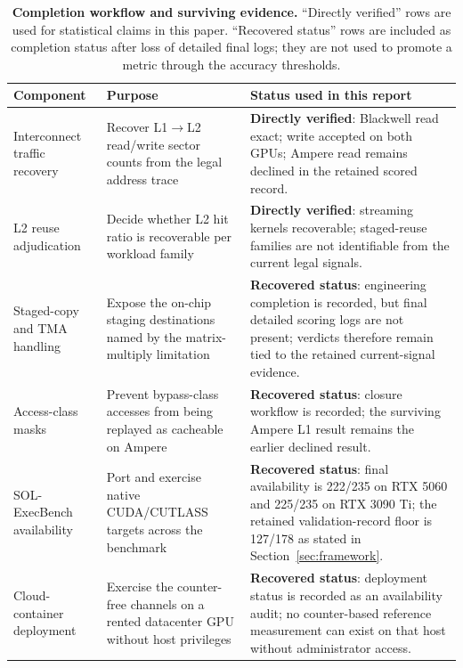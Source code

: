 \documentclass[conference]{IEEEtran}
\begin{document}
\begin{table}[!h]
\centering
\caption{\textbf{Completion workflow and surviving evidence.} ``Directly
verified'' rows are used for statistical claims in this paper. ``Recovered
status'' rows are included as completion status after loss of detailed final
logs; they are not used to promote a metric through the accuracy thresholds.}
\label{tab:status}
\setlength{\tabcolsep}{3pt}
\renewcommand{\arraystretch}{1.15}
\scriptsize
\begin{tabular}{@{}>{\raggedright\arraybackslash}p{1.65cm}>{\raggedright\arraybackslash}p{3.05cm}>{\raggedright\arraybackslash}p{3.35cm}@{}}
\toprule
\textbf{Component} & \textbf{Purpose} & \textbf{Status used in this report} \\
\midrule
Interconnect traffic recovery & Recover L1$\rightarrow$L2 read/write sector
counts from the legal address trace & \textbf{Directly verified}: Blackwell read
exact; write accepted on both GPUs; Ampere read remains declined in the
retained scored record.\\
\addlinespace[1.5pt]
L2 reuse adjudication & Decide whether L2 hit ratio is recoverable per
workload family & \textbf{Directly verified}: streaming kernels recoverable;
staged-reuse families are not identifiable from the current legal signals.\\
\addlinespace[1.5pt]
Staged-copy and TMA handling & Expose the on-chip staging destinations named
by the matrix-multiply limitation & \textbf{Recovered status}:
engineering completion is recorded, but final detailed scoring logs are
not present; verdicts therefore remain tied to the retained current-signal
evidence.\\
\addlinespace[1.5pt]
Access-class masks & Prevent bypass-class accesses from being replayed as
cacheable on Ampere & \textbf{Recovered status}: closure workflow is recorded;
the surviving Ampere L1 result remains the earlier declined result.\\
\addlinespace[1.5pt]
SOL-ExecBench availability & Port and exercise native CUDA/CUTLASS targets
across the benchmark & \textbf{Recovered status}: final availability is
222/235 on RTX 5060 and 225/235 on RTX 3090 Ti; the retained validation-record floor is
127/178 as stated in Section~\ref{sec:framework}.\\
\addlinespace[1.5pt]
Cloud-container deployment & Exercise the counter-free channels on a rented
datacenter GPU without host privileges & \textbf{Recovered status}: deployment
status is recorded as an availability audit; no counter-based reference measurement can
exist on that host without administrator access.\\
\bottomrule
\end{tabular}
\end{table}
\end{document}

